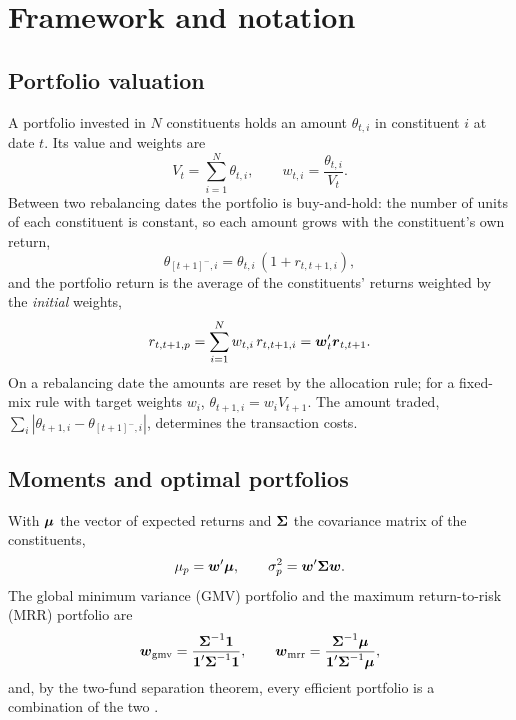 \section{Framework and notation}\label{sec:framework}

\subsection{Portfolio valuation}

A portfolio invested in $N$ constituents holds an amount $\theta_{t,i}$ in constituent $i$ at date $t$.
Its value and weights are
\begin{equation}
  V_t = \sum_{i=1}^N \theta_{t,i}, \qquad w_{t,i} = \frac{\theta_{t,i}}{V_t}.
\end{equation}
Between two rebalancing dates the portfolio is buy-and-hold: the number of units of each constituent is constant, so each amount grows with the constituent's own return,
\begin{equation}\label{eq:amount-update}
  \theta_{[t+1]^-,i} = \theta_{t,i}\,(1 + r_{t,t+1,i}),
\end{equation}
and the portfolio return is the average of the constituents' returns weighted by the \emph{initial} weights,
\begin{equation}\label{eq:fundamental}
  r_{t,t+1,p} = \sum_{i=1}^N w_{t,i}\, r_{t,t+1,i} = \boldsymbol{w}_t' \boldsymbol{r}_{t,t+1}.
\end{equation}
On a rebalancing date the amounts are reset by the allocation rule; for a fixed-mix rule with target weights $w_i$, $\theta_{t+1,i} = w_i V_{t+1}$.
The amount traded, $\sum_i |\theta_{t+1,i} - \theta_{[t+1]^-,i}|$, determines the transaction costs.

\subsection{Moments and optimal portfolios}

With $\boldsymbol{\mu}$ the vector of expected returns and $\boldsymbol{\Sigma}$ the covariance matrix of the constituents,
\begin{equation}
  \mu_p = \boldsymbol{w}'\boldsymbol{\mu}, \qquad \sigma_p^2 = \boldsymbol{w}'\boldsymbol{\Sigma}\boldsymbol{w}.
\end{equation}
The global minimum variance (GMV) portfolio and the maximum return-to-risk (MRR) portfolio are
\begin{equation}
  \boldsymbol{w}_{\mathrm{gmv}} = \frac{\boldsymbol{\Sigma}^{-1}\boldsymbol{1}}{\boldsymbol{1}'\boldsymbol{\Sigma}^{-1}\boldsymbol{1}}, \qquad
  \boldsymbol{w}_{\mathrm{mrr}} = \frac{\boldsymbol{\Sigma}^{-1}\boldsymbol{\mu}}{\boldsymbol{1}'\boldsymbol{\Sigma}^{-1}\boldsymbol{\mu}},
\end{equation}
and, by the two-fund separation theorem, every efficient portfolio is a combination of the two \citep{milhau2026}.


